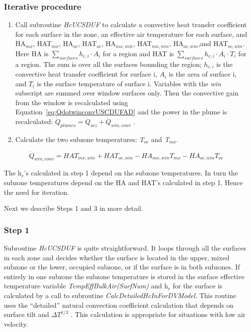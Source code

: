 {\subsubsection{Iterative procedure}\label{iterative-procedure-2}

\begin{enumerate}
\item Call subroutine \emph{HcUCSDUF} to calculate a convective heat transfer coefficient for each surface in the zone, an effective air temperature for each surface, and HA\(_{mx}\), HAT\(_{mx}\), HA\(_{oc}\), HAT\(_{oc}\), HA\(_{mx,win}\), HAT\(_{mx,win}\), HA\(_{oc,win}\),and HAT\(_{oc,win}\). Here HA is \(\sum\limits_{surfaces} {{h_{c,i}} \cdot {A_i}}\) for a region and HAT is \(\sum\limits_{surfaces} {{h_{c,i}} \cdot {A_i}} \cdot {T_i}\) for a region. The sum is over all the surfaces bounding the region; \({h_{c,i}}\) is the convective heat transfer coefficient for surface i, \({A_i}\) is the area of surface i, and \({T_i}\) is the surface temperature of surface i. Variables with the \emph{win} subscript are summed over window surfaces only. Then the convective gain from the window is recalculated using Equation~\ref{eq:QdotwinconvUSCDUFAD} and the power in the plume is recalculated: \({\dot Q_{plumes}} = {\dot Q_{ocz}} + {\dot Q_{win,conv}}\) .
\item Calculate the two subzone temperatures: \emph{T\(_{oc}\)} and \emph{T\(_{mx}\)}.
\end{enumerate}

\begin{equation}
{\dot Q_{win,conv}} = HA{T_{mx,win}} + HA{T_{oc,win}} - H{A_{mx,win}}{T_{mx}} - H{A_{oc,win}}{T_{oc}}
\label{eq:QdotwinconvUSCDUFAD}
\end{equation}

The h\(_{c}\)'s calculated in step 1 depend on the subzone temperatures. In turn the subzone temperatures depend on the HA and HAT's calculated in step 1. Hence the need for iteration.

Next we describe Steps 1 and 3 in more detail.

\subsubsection{Step 1}\label{step-1-2}

Subroutine \emph{HcUCSDUF} is quite straightforward. It loops through all the surfaces in each zone and decides whether the surface is located in the upper, mixed subzone or the lower, occupied subzone, or if the surface is in both subzones. If entirely in one subzone the subzone temperature is stored in the surface effective temperature variable \emph{TempEffBulkAir(SurfNum)} and h\(_{c}\) for the surface is calculated by a call to subroutine \emph{CalcDetailedHcInForDVModel}. This routine uses the ``detailed'' natural convection coefficient calculation that depends on surface tilt and \(\Delta {T^{1/3}}\) . This calculation is appropriate for situations with low air velocity.

}
